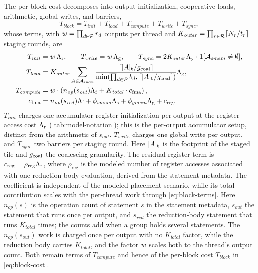 The per-block cost decomposes into output initialization, cooperative loads, arithmetic, global writes, and barriers,
\begin{equation}
T_{\mathit{block}}
= T_{\mathit{init}} + T_{\mathit{load}} + T_{\mathit{compute}} +
   T_{\mathit{write}} + T_{\mathit{sync}},
\label{eq:block-cost}
\end{equation}
whose terms, with \(w=\prod_{d\in\mathcal{P}}r_d\) outputs per thread and \(K_{\mathit{outer}}=\prod_{r\in\mathcal{R}}\lceil N_r/t_r\rceil\) staging rounds, are
\begin{equation}
\begin{aligned}
T_{\mathit{init}} &= w\,\Lambda_{\mathrm r},
\qquad
T_{\mathit{write}} = w\,\Lambda_{\mathrm g},
\qquad
T_{\mathit{sync}} = 2K_{\mathit{outer}}\Lambda_{\mathrm y}\cdot
  \mathbf{1}[\mathcal{A}_{\mathit{smem}}\ne\emptyset],\\
T_{\mathit{load}} &= K_{\mathit{outer}}\sum_{A \in \mathcal{A}_{\mathit{smem}}}
  \frac{\lceil |A|_{\mathbf{t}} / g_{\mathrm{coal}} \rceil}
       {\min(\prod_{d \in \mathcal{P}} b_d,\lceil |A|_{\mathbf{t}} / g_{\mathrm{coal}} \rceil)}
  \Lambda_{\mathrm g},\\
T_{\mathit{compute}} &= w \cdot
  \left(n_{\mathit{op}}(s_{\mathit{out}})\Lambda_{\mathrm f}
  + K_{\mathit{total}}\cdot c_{\mathrm{fma}}\right),\\
c_{\mathrm{fma}} &= n_{\mathit{op}}(s_{\mathit{red}})\Lambda_{\mathrm f}
  + \phi_{\mathit{smem}}\Lambda_{\mathrm s}
  + \phi_{\mathit{gmem}}\Lambda_{\mathrm g}
  + c_{\mathrm{reg}}.
\end{aligned}
\label{eq:block-terms}
\end{equation}
\(T_{\mathit{init}}\) charges one accumulator-register initialization per output at the register-access cost \(\Lambda_{\mathrm r}\) (\autoref{tab:model-notation}); this is the per-output accumulator setup, distinct from the arithmetic of \(s_{\mathit{out}}\). \(T_{\mathit{write}}\) charges one global write per output, and \(T_{\mathit{sync}}\) two barriers per staging round. Here \(|A|_{\mathbf{t}}\) is the footprint of the staged tile and \(g_{\mathrm{coal}}\) the coalescing granularity. The residual register term is \(c_{\mathrm{reg}}=\rho_{\mathrm{reg}}\Lambda_{\mathrm r}\), where \(\rho_{\mathrm{reg}}\) is the modeled number of register accesses associated with one reduction-body evaluation, derived from the statement metadata. The coefficient is independent of the modeled placement scenario, while its total contribution scales with the per-thread work through \autoref{eq:block-terms}. Here \(n_{\mathit{op}}(s)\) is the operation count of statement \(s\) in the statement metadata, \(s_{\mathit{out}}\) the statement that runs once per output, and \(s_{\mathit{red}}\) the reduction-body statement that runs \(K_{\mathit{total}}\) times; the counts add when a group holds several statements. The \(n_{\mathit{op}}(s_{\mathit{out}})\) work is charged once per output with no \(K_{\mathit{total}}\) factor, while the reduction body carries \(K_{\mathit{total}}\), and the factor \(w\) scales both to the thread's output count. Both remain terms of \(T_{\mathit{compute}}\) and hence of the per-block cost \(T_{\mathit{block}}\) in \autoref{eq:block-cost}.

